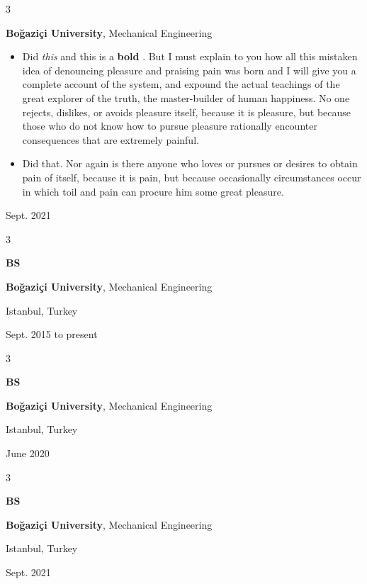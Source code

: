 \documentclass[10pt, letterpaper]{article}
\newenvironment{highlights}{
    \begin{itemize}[
        topsep=0.10 cm,
        parsep=0.10 cm,
        partopsep=0pt,
        itemsep=0pt,
        leftmargin=0.4 cm + 10pt
    ]
}{
    \end{itemize}
} %
\newenvironment{threecolentry}[3][]{
    \onecolentry
    \def\thirdColumn{#3}
    \setcolumnwidth{1 cm, \fill, 4.5 cm}
    \begin{paracol}{3}
    {\raggedright #2} \switchcolumn
}{
    \switchcolumn \raggedleft \thirdColumn
    \end{paracol}
    \endonecolentry
} %
\let\hrefWithoutArrow\href
\renewcommand{\href}[2]{\hrefWithoutArrow{#1}{\mbox{\ifthenelse{\equal{#2}{}}{ }{#2 }\raisebox{.15ex}{\footnotesize \faExternalLink*}}}}
\begin{document}
        \vspace{0.2 cm}

        \begin{threecolentry}{\textbf{}}{
            Sept. 2021
        }
            \textbf{Boğaziçi University}, Mechanical Engineering
            \begin{highlights}
                \item Did \textit{this} and this is a \textbf{bold} \href{https://example.com}{link}. But I must explain to you how all this mistaken idea of denouncing pleasure and praising pain was born and I will give you a complete account of the system, and expound the actual teachings of the great explorer of the truth, the master-builder of human happiness. No one rejects, dislikes, or avoids pleasure itself, because it is pleasure, but because those who do not know how to pursue pleasure rationally encounter consequences that are extremely painful.
                \item Did that. Nor again is there anyone who loves or pursues or desires to obtain pain of itself, because it is pain, but because occasionally circumstances occur in which toil and pain can procure him some great pleasure.
            \end{highlights}
        \end{threecolentry}

        \vspace{0.2 cm}

        \begin{threecolentry}{\textbf{BS}}{
            Istanbul, Turkey

        Sept. 2015 to present
        }
            \textbf{Boğaziçi University}, Mechanical Engineering
        \end{threecolentry}

        \vspace{0.2 cm}

        \begin{threecolentry}{\textbf{BS}}{
            Istanbul, Turkey

        June 2020
        }
            \textbf{Boğaziçi University}, Mechanical Engineering
        \end{threecolentry}

        \vspace{0.2 cm}

        \begin{threecolentry}{\textbf{BS}}{
            Istanbul, Turkey

        Sept. 2021
        }
            \textbf{Boğaziçi University}, Mechanical Engineering
        \end{threecolentry}
\end{document}
